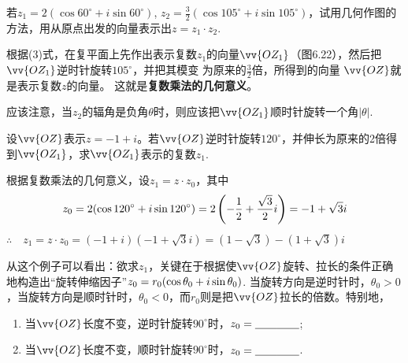 \begin{example}
    若$z_1=2(\cos60^{\circ}+i\sin60^{\circ})$, $z_2=\frac{3}{2}(\cos105^{\circ}+i
\sin105^{\circ})$，试用几何作图的方法，用从原点出发的向量表示出$z=z_1\cdot z_2$.
\end{example}


\noindent
\begin{minipage}{.5\textwidth}
    \CTEXindent
\begin{solution}
根据(3)式，在复平面上先作出表示复数$z_1$的向量$\vv{OZ_1}$（图6.22），然后把$\vv{OZ_1}$逆时针旋转$105^{\circ}$，并把其模变
为原来的$\frac{3}{2}$倍，所得到的向量
$\vv{OZ}$就是表示复数$z$的向量。
这就是\textbf{复数乘法的几何意义}。

应该注意，当$z_2$的辐角是负角$\theta$时，则应该把$\vv{OZ_1}$顺时针旋转一个角$|\theta|$.
\end{solution}    
\end{minipage}\hfill
\begin{minipage}{.45\textwidth}
\centering
{}
\end{minipage}   


\begin{example}
    设$\vv{OZ}$表示$z=-1+i$。若$\vv{OZ}$逆时针旋转$120^{\circ}$，并伸长为原来的2倍得到$\vv{OZ_1}$，求$\vv{OZ_1}$表示的复数$z_1$.
\end{example}

\begin{solution}
    根据复数乘法的几何意义，设$z_1=z\cdot z_0$，其中
\[z_0=2(\cos120^{\circ}+i\sin120^{\circ})=2\left(-\dfrac{1}{2}+\dfrac{\sqrt{3}}{2}i\right)=-1+\sqrt{3}i\]
$\therefore\quad z_1=z\cdot z_0=(-1+i)\left(-1+\sqrt{3}i\right)=\left(1-\sqrt{3}\right)-\left(1+\sqrt{3}\right)i$
\end{solution}

\begin{rmk}
    从这个例子可以看出：欲求$z_1$，关键在于根据使$\vv{OZ}$旋转、拉长的条件正确地构造出“旋转伸缩因子”$z_0=r_0(\cos\theta_0+i\sin\theta_0)$. 当旋转方向是逆时针时，$\theta_0>0$，当旋转方向是顺时针时，$\theta_0<0$，而$r_0$则是把$\vv{OZ}$拉长的倍数。特别地，
\begin{enumerate}[(1)]
\item 当$\vv{OZ}$长度不变，逆时针旋转$90^{\circ}$时，$z_0=\underline{\qquad}\underline{\qquad}$;
\item 当$\vv{OZ}$长度不变，顺时针旋转$90^{\circ}$时，$z_0=\underline{\qquad}\underline{\qquad}$.
\end{enumerate}
\end{rmk}

